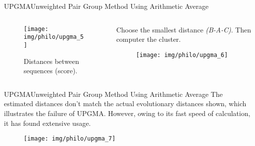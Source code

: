 \documentclass[10pt]{beamer}
\newcommand{\1}{
	\setbeamertemplate{background}{
		\texttt{[image: img/1]}
		\tikz[overlay] \fill[fill opacity=0.75,fill=white] (0,0) rectangle (-\paperwidth,\paperheight);
	}
}
\begin{document}
\begin{frame}{UPGMA}{Unweighted Pair Group Method Using Arithmetic Average}
	\begin{columns}
		\begin{column}{0.48\textwidth}
			\begin{figure}
				\texttt{[image: img/philo/upgma\_5]}
				\caption{Distances between sequences (score).}
			\end{figure}
		\end{column}
		\begin{column}{0.48\textwidth}
			
			Choose the smallest distance \textit{(B-A-C)}. Then computer the cluster.\\ 					
			
			\begin{figure}
				\texttt{[image: img/philo/upgma\_6]}
			\end{figure}
			
		\end{column}
	\end{columns}
	
\end{frame}

\begin{frame}{UPGMA}{Unweighted Pair Group Method Using Arithmetic Average}
The estimated distances don’t match the actual evolutionary distances shown, which illustrates the failure of UPGMA. However, owing to its fast speed of calculation, it has found extensive usage.

	\begin{figure}
		\texttt{[image: img/philo/upgma\_7]}
	\end{figure}
\end{frame}
\end{document}

